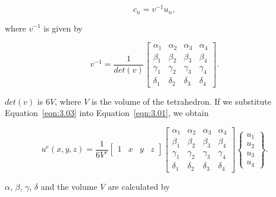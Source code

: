\begin{equation}
c_{n} = v^{-1} u_{n},
\label{eqn:3.03}
\end{equation}

\noindent where $v^{-1}$ is given by

\begin{equation}
v^{-1} =
\frac{1}{det(v)}
\begin{bmatrix}
\alpha_{1} & \alpha_{2} & \alpha_{3} & \alpha_{4} \\
\beta_{1} & \beta_{2} & \beta_{3} & \beta_{4} \\
\gamma_{1} & \gamma_{2} & \gamma_{3} & \gamma_{4} \\
\delta_{1} & \delta_{2} & \delta_{3} & \delta_{4}
\end{bmatrix}.
\label{eqn:3.04}
\end{equation}

\noindent $det(v)$ is $6V$, where $V$ is the volume of the tetrahedron. If we substitute Equation~\ref{eqn:3.03} into Equation~\ref{eqn:3.01}, we obtain

\begin{equation}
u^e(x,y,z)
=
\frac{1}{6V^{e}}
\begin{bmatrix}
1 & x & y & z
\end{bmatrix}
\begin{bmatrix}
\alpha_{1} & \alpha_{2} & \alpha_{3} & \alpha_{4} \\
\beta_{1} & \beta_{2} & \beta_{3} & \beta_{4} \\
\gamma_{1} & \gamma_{2} & \gamma_{3} & \gamma_{4} \\
\delta_{1} & \delta_{2} & \delta_{3} & \delta_{4}
\end{bmatrix}
\begin{Bmatrix}
u_{1} \\ u_{2} \\ u_{3}  \\ u_{4}
\end{Bmatrix}.
\label{eqn:3.05}
\end{equation}

\noindent $\alpha$, $\beta$, $\gamma$, $\delta$ and the volume $V$ are calculated by


